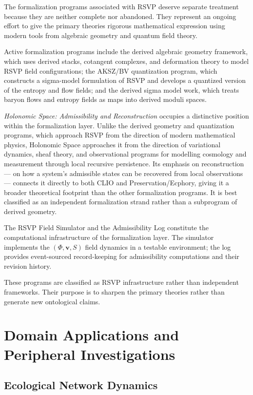 \documentclass[12pt, twoside]{article}
\begin{document}
The formalization programs associated with RSVP deserve separate treatment
because they are neither complete nor abandoned. They represent an ongoing
effort to give the primary theories rigorous mathematical expression using
modern tools from algebraic geometry and quantum field theory.

Active formalization programs include the derived algebraic geometry
framework, which uses derived stacks, cotangent complexes, and deformation
theory to model RSVP field configurations; the AKSZ/BV quantization program,
which constructs a sigma-model formulation of RSVP and develops a quantized
version of the entropy and flow fields; and the derived sigma model work,
which treats baryon flows and entropy fields as maps into derived moduli
spaces.

\emph{Holonomic Space: Admissibility and Reconstruction} occupies a
distinctive position within the formalization layer. Unlike the derived
geometry and quantization programs, which approach RSVP from the direction
of modern mathematical physics, Holonomic Space approaches it from the
direction of variational dynamics, sheaf theory, and observational programs
for modelling cosmology and measurement through local recursive persistence.
Its emphasis on reconstruction — on how a system's admissible states can be
recovered from local observations — connects it directly to both CLIO and
Preservation/Ecphory, giving it a broader theoretical footprint than the
other formalization programs. It is best classified as an independent
formalization strand rather than a subprogram of derived geometry.

The RSVP Field Simulator and the Admissibility Log constitute the
computational infrastructure of the formalization layer. The simulator
implements the $(\Phi, \mathbf{v}, S)$ field dynamics in a testable
environment; the log provides event-sourced record-keeping for admissibility
computations and their revision history.

These programs are classified as RSVP infrastructure rather than independent
frameworks. Their purpose is to sharpen the primary theories rather than
generate new ontological claims.

\section{Domain Applications and Peripheral Investigations}

\subsection{Ecological Network Dynamics}
\end{document}
